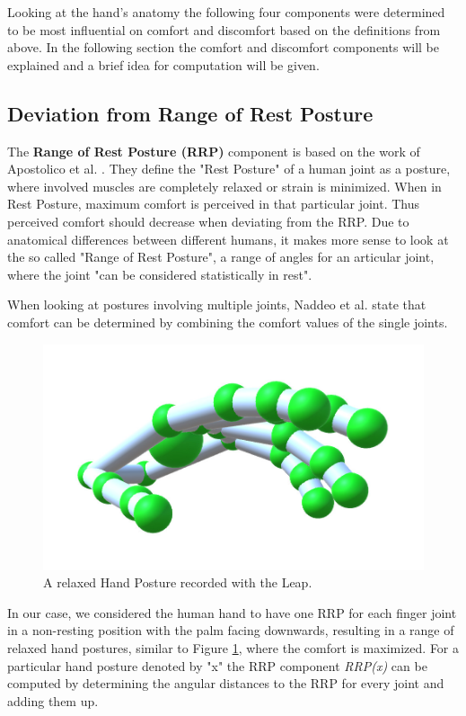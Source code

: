 Looking at the hand's anatomy the following four components were determined to be most influential on comfort and discomfort based on the definitions from above. In the following section the comfort and discomfort components will be explained and a brief idea for computation will be given. 

\subsection{Deviation from Range of Rest Posture}

The \textbf{Range of Rest Posture (RRP)} component is based on the work of Apostolico et al. \cite{apostolico2014postural}. They define the "Rest Posture" of a human joint as a posture, where involved muscles are completely relaxed or strain is minimized. When in Rest Posture, maximum comfort is perceived in that particular joint. Thus perceived comfort should decrease when deviating from the RRP. 
Due to anatomical differences between different humans, it makes more sense to look at the so called "Range of Rest Posture", a range of angles for an articular joint, where the joint "can be considered statistically in rest".

When looking at postures involving multiple joints, Naddeo et al. \cite{naddeo2015proposal} state that comfort can be determined by combining the comfort values of the single joints.

\begin{figure}
\centering
\includegraphics[width=\textwidth]{relaxed}
\caption{A relaxed Hand Posture recorded with the Leap.}
\label{fig:relaxed}
\end{figure}

In our case, we considered the human hand to have one RRP for each finger joint in a non-resting position with the palm facing downwards, resulting in a range of relaxed hand postures, similar to Figure \ref{fig:relaxed}, where the comfort is maximized. For a particular hand posture denoted by "x" the RRP component \textit{RRP(x)} can be computed by determining the angular distances to the RRP for every joint and adding them up.

